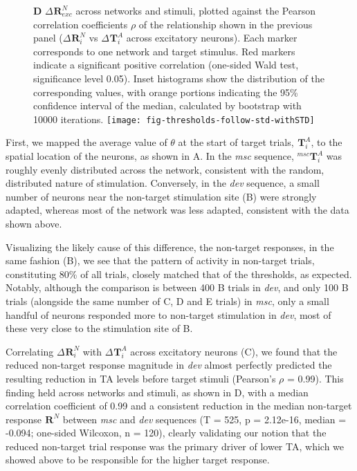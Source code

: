 \documentclass[9pt,lineno,onehalfspacing]{elife}
\newcommand{\dev}{\textit{dev}}
\newcommand{\msc}{\textit{msc}}
\newcommand{\R}[3][]{{}^{#1}_{}\boldsymbol R^{#2}_{#3}}
\newcommand{\T}[3][]{{}^{#1}_{}\boldsymbol T^{#2}_{#3}}
\begin{document}
\begin{figure}
{        \textbf{D} $\Delta \R{N}{exc}$ across networks and stimuli, plotted against the Pearson correlation coefficients $\rho$ of the relationship shown in the previous panel ($\Delta \R{N}{i}$ vs $\Delta \T{A}{i}$ across excitatory neurons). Each marker corresponds to one network and target stimulus. Red markers indicate a significant positive correlation (one-sided Wald test, significance level 0.05). Inset histograms show the distribution of the corresponding values, with orange portions indicating the 95\% confidence interval of the median, calculated by bootstrap with 10000 iterations.
    }
    {\texttt{[image: fig-thresholds-follow-std-withSTD]}}\label{figsupp:withSTD}
\end{figure}

First, we mapped the average value of $\theta$ at the start of target trials, $\T{A}{i}$, to the spatial location of the neurons, as shown in A. In the \msc{} sequence, $\T[msc]{A}{i}$ was roughly evenly distributed across the network, consistent with the random, distributed nature of stimulation. Conversely, in the \dev{} sequence, a small number of neurons near the non-target stimulation site (B) were strongly adapted, whereas most of the network was less adapted, consistent with the data shown above.

Visualizing the likely cause of this difference, the non-target responses, in the same fashion (B), we see that the pattern of activity in non-target trials, constituting 80\% of all trials, closely matched that of the thresholds, as expected. Notably, although the comparison is between 400 B trials in \dev{}, and only 100 B trials (alongside the same number of C, D and E trials) in \msc{}, only a small handful of neurons responded more to non-target stimulation in \dev{}, most of these very close to the stimulation site of B.

Correlating $\Delta \R{N}{i}$ with $\Delta \T{A}{i}$ across excitatory neurons (C), we found that the reduced non-target response magnitude in \dev{} almost perfectly predicted the resulting reduction in TA levels before target stimuli (Pearson's $\rho$ = 0.99).
This finding held across networks and stimuli, as shown in D, with a median correlation coefficient of 0.99 and a consistent reduction in the median non-target response $\R{N}{}$ between \msc{} and \dev{} sequences (T = 525, p = 2.12e-16, median = -0.094; one-sided Wilcoxon, n = 120), clearly validating our notion that the reduced non-target trial response was the primary driver of lower TA, which we showed above to be responsible for the higher target response.
\end{document}
